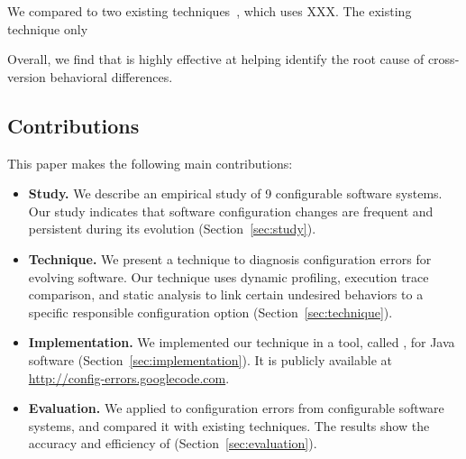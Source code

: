 We compared \ourtool to two existing techniques~\cite{}, which uses XXX.
The existing technique only

Overall, we find that \ourtool is highly effective at helping
identify the root cause of cross-version behavioral differences. 

\subsection{Contributions}

This paper makes the following main contributions:

\begin{itemize}
\vspace{-3mm}
\item \textbf{Study.} We describe an empirical
study of 9 configurable software systems.
Our study indicates that software configuration changes
are frequent and persistent during its evolution (Section~\ref{sec:study}).

\item \textbf{Technique.} We present a technique to diagnosis
configuration errors for evolving software. Our technique
uses dynamic profiling, execution trace comparison, and
static analysis to link certain undesired behaviors to a
specific responsible configuration option (Section~\ref{sec:technique}).

\item \textbf{Implementation.} We implemented our technique
in a tool, called \ourtool, for Java software (Section~\ref{sec:implementation}).
It is publicly available at \url{http://config-errors.googlecode.com}.

\item \textbf{Evaluation.} We applied \ourtool to \errornum configuration
errors from \subjnum configurable software systems,
and compared it with existing techniques.
The results show the accuracy and efficiency of \ourtool (Section~\ref{sec:evaluation}).
\end{itemize}
